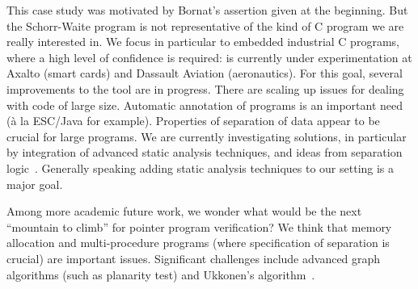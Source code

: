 This case study was motivated by Bornat's assertion given at the
beginning. But the Schorr-Waite program is not representative of the
kind of C program we are really interested in. We focus in particular
to embedded industrial C programs, where a high level of confidence is
required: \caduceus{} is currently under experimentation at Axalto
(smart cards) and Dassault Aviation (aeronautics). For this goal,
several improvements to the \caduceus{} tool are in progress. There
are scaling up issues for dealing with code of large size. Automatic
annotation of programs is an important need (\`a la ESC/Java for
example). Properties of separation of data appear to be crucial for
large programs. We are currently investigating solutions, in
particular by integration of advanced static analysis techniques, and
ideas from separation logic~\cite{reynolds02lics}. Generally speaking
adding static analysis techniques to our setting is a major goal.

Among more academic future work, we wonder what would be the next
``mountain to climb'' for pointer program verification? We think that
memory allocation and multi-procedure programs (where specification of
separation is crucial) are important issues. Significant challenges
include advanced graph algorithms (such as planarity test) and
Ukkonen's algorithm~\cite{ukkonen95}.




